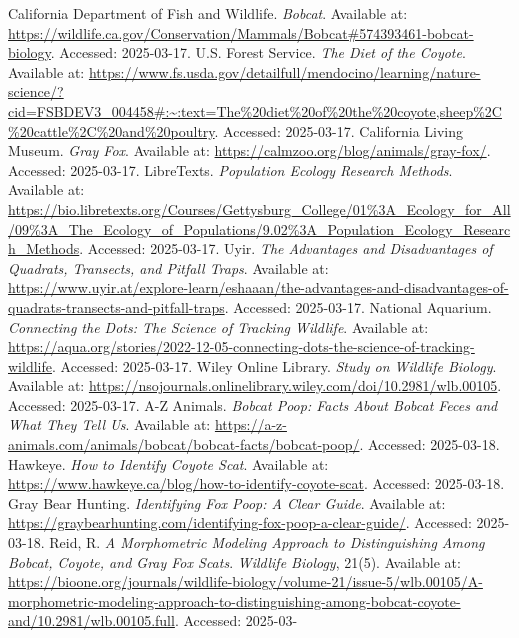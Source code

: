 \documentclass[a4paper]{article}
\begin{document}
\renewcommand{\refname}{Bibliography}
\begin{thebibliography}{99}

     California Department of Fish and Wildlife. \textit{Bobcat}. Available at: \url{https://wildlife.ca.gov/Conservation/Mammals/Bobcat#574393461-bobcat-biology}. Accessed: 2025-03-17.
     U.S. Forest Service. \textit{The Diet of the Coyote}. Available at: \url{https://www.fs.usda.gov/detailfull/mendocino/learning/nature-science/?cid=FSBDEV3_004458#:~:text=The%20diet%20of%20the%20coyote,sheep%2C%20cattle%2C%20and%20poultry}. Accessed: 2025-03-17.
     California Living Museum. \textit{Gray Fox}. Available at: \url{https://calmzoo.org/blog/animals/gray-fox/}. Accessed: 2025-03-17.
     LibreTexts. \textit{Population Ecology Research Methods}. Available at: \url{https://bio.libretexts.org/Courses/Gettysburg_College/01%3A_Ecology_for_All/09%3A_The_Ecology_of_Populations/9.02%3A_Population_Ecology_Research_Methods}. Accessed: 2025-03-17.
     Uyir. \textit{The Advantages and Disadvantages of Quadrats, Transects, and Pitfall Traps}. Available at: \url{https://www.uyir.at/explore-learn/eshaaan/the-advantages-and-disadvantages-of-quadrats-transects-and-pitfall-traps}. Accessed: 2025-03-17.
     National Aquarium. \textit{Connecting the Dots: The Science of Tracking Wildlife}. Available at: \url{https://aqua.org/stories/2022-12-05-connecting-dots-the-science-of-tracking-wildlife}. Accessed: 2025-03-17.
     Wiley Online Library. \textit{Study on Wildlife Biology}. Available at: \url{https://nsojournals.onlinelibrary.wiley.com/doi/10.2981/wlb.00105}. Accessed: 2025-03-17.
     A-Z Animals. \textit{Bobcat Poop: Facts About Bobcat Feces and What They Tell Us}. Available at: \url{https://a-z-animals.com/animals/bobcat/bobcat-facts/bobcat-poop/}. Accessed: 2025-03-18.
     Hawkeye. \textit{How to Identify Coyote Scat}. Available at: \url{https://www.hawkeye.ca/blog/how-to-identify-coyote-scat}. Accessed: 2025-03-18.
     Gray Bear Hunting. \textit{Identifying Fox Poop: A Clear Guide}. Available at: \url{https://graybearhunting.com/identifying-fox-poop-a-clear-guide/}. Accessed: 2025-03-18.
     Reid, R. \textit{A Morphometric Modeling Approach to Distinguishing Among Bobcat, Coyote, and Gray Fox Scats}. \textit{Wildlife Biology}, 21(5). Available at: \url{https://bioone.org/journals/wildlife-biology/volume-21/issue-5/wlb.00105/A-morphometric-modeling-approach-to-distinguishing-among-bobcat-coyote-and/10.2981/wlb.00105.full}. Accessed: 2025-03-


\end{thebibliography}
\end{document}
